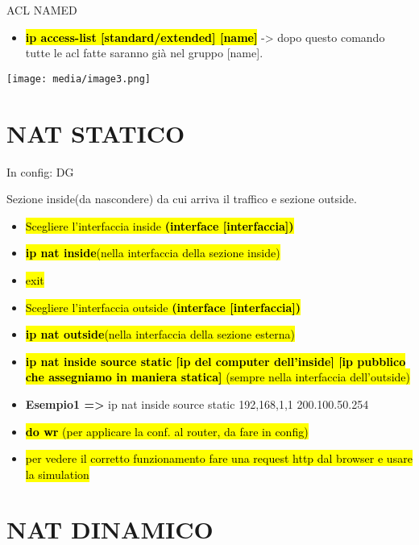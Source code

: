 ACL NAMED

\begin{itemize}
\item
  \textbf{\hl{ip access-list {[}standard/extended{]} {[}name{]}}}
  -\textgreater{} dopo questo comando tutte le acl fatte saranno già nel
  gruppo {[}name{]}.
\end{itemize}

\texttt{[image: media/image3.png]}

\section{NAT STATICO}\label{nat-statico}

In config: DG

Sezione inside(da nascondere) da cui arriva il traffico e sezione
outside.

\begin{itemize}
\item
  \hl{Scegliere l'interfaccia inside \textbf{(interface
  {[}interfaccia{]})}}
\item
  \hl{\textbf{ip nat inside}(nella interfaccia della sezione inside)}
\item
  \hl{exit}
\item
  \hl{Scegliere l'interfaccia outside \textbf{(interface
  {[}interfaccia{]})}}
\item
  \hl{\textbf{ip nat outside}(nella interfaccia della sezione esterna)}
\item
  \hl{\textbf{ip nat inside source static {[}ip del computer
  dell'inside{]} {[}ip pubblico che assegniamo in maniera statica{]}}
  (sempre nella interfaccia dell'outside)}
\item
  \textbf{Esempio1 =\textgreater{}} ip nat inside source static
  192,168,1,1 200.100.50.254
\item
  \hl{\textbf{do wr} (per applicare la conf. al router, da fare in
  config)}
\item
  \hl{per vedere il corretto funzionamento fare una request http dal
  browser e usare la simulation}
\end{itemize}

\section{NAT DINAMICO}\label{nat-dinamico}

